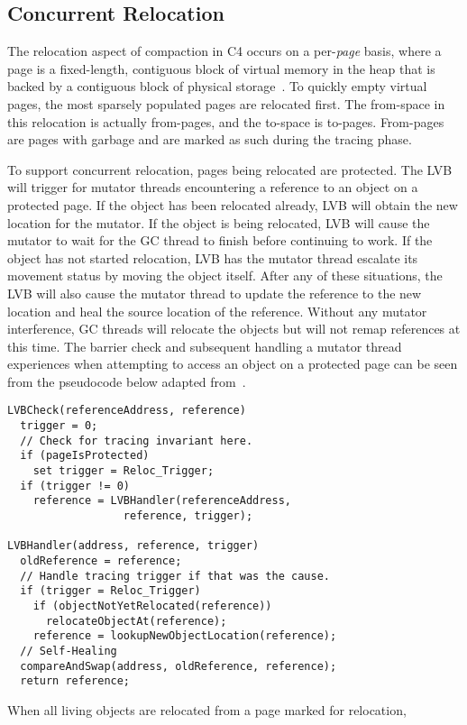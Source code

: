 \documentclass{sig-alternate}
\begin{document}
\subsection{Concurrent Relocation}
\label{sec:c4Relocation}

The relocation aspect of compaction in C4 occurs on a per-\emph{page}
basis, where a page is a fixed-length, contiguous block of virtual memory in the heap
that is backed by a contiguous block of physical storage~\cite{Tene:C4}.
To quickly empty virtual pages, the most sparsely populated pages are relocated
first. The from-space in this relocation is actually from-pages, and the to-space
is to-pages. From-pages are pages with garbage
and are marked as such during the tracing phase.

To support concurrent relocation, pages being relocated are protected. 
The LVB will trigger for mutator threads encountering a reference to an object
on a protected page. If the object has been relocated already, LVB will
obtain the new location for the mutator. If the object is being relocated, 
LVB will cause the mutator to wait
for the GC thread to finish before continuing to work.
If the object has not started relocation, LVB has the mutator thread 
escalate its movement status by moving the object itself. After any of 
these situations, the LVB will also cause the mutator thread to update 
the reference to the new location and heal the source location of the reference.
Without any mutator interference, GC threads will relocate the objects but
will not remap references at this time. The barrier check and subsequent
handling a mutator thread experiences when attempting to access an object on a
protected page can be seen from the pseudocode below adapted from~\cite{Tene:C4}.
\begin{verbatim}
LVBCheck(referenceAddress, reference)
  trigger = 0;
  // Check for tracing invariant here.
  if (pageIsProtected)
    set trigger = Reloc_Trigger;
  if (trigger != 0)
    reference = LVBHandler(referenceAddress, 
                  reference, trigger);
    
LVBHandler(address, reference, trigger)
  oldReference = reference;
  // Handle tracing trigger if that was the cause.
  if (trigger = Reloc_Trigger) 
    if (objectNotYetRelocated(reference))
      relocateObjectAt(reference);
    reference = lookupNewObjectLocation(reference);
  // Self-Healing
  compareAndSwap(address, oldReference, reference);
  return reference;
\end{verbatim}
When all living objects are relocated from a page marked for relocation,
\end{document}
